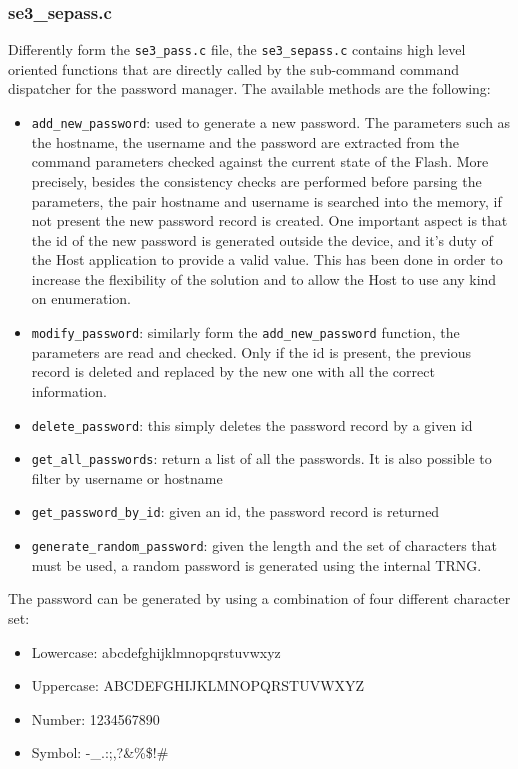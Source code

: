 \subsubsection{se3\_sepass.c}
Differently form the \texttt{se3\_pass.c} file, the \texttt{se3\_sepass.c} contains high level oriented functions that are directly called by the sub-command command dispatcher for the password manager.\newline\newline
The available methods are the following:
\begin{itemize}
	\item \texttt{add\_new\_password}: used to generate a new password. The parameters such as the hostname, the username and the password are extracted from the command parameters checked against the current state of the Flash. More precisely, besides the consistency checks are performed before parsing the parameters, the pair hostname and username is searched into the memory, if not present the new password record is created. One important aspect is that the id of the new password is generated outside the device, and it's duty of the Host application to provide a valid value. This has been done in order to increase the flexibility of the solution and to allow the Host to use any kind on enumeration.
	\item \texttt{modify\_password}: similarly form the \texttt{add\_new\_password} function, the parameters are read and checked. Only if the id is present, the previous record is deleted and replaced by the new one with all the correct information.
	\item \texttt{delete\_password}: this simply deletes the password record by a given id
	\item \texttt{get\_all\_passwords}: return a list of all the passwords. It is also possible to filter by username or hostname
	\item \texttt{get\_password\_by\_id}: given an id, the password record is returned
	\item \texttt{generate\_random\_password}: given the length and the set of characters that must be used, a random password is generated using the internal TRNG.
\end{itemize}

The password can be generated by using a combination of four different character set:
\begin{itemize}
	\item Lowercase: abcdefghijklmnopqrstuvwxyz
	\item Uppercase: ABCDEFGHIJKLMNOPQRSTUVWXYZ
	\item Number: 1234567890
	\item Symbol: -\_.:;,?\&\%\$!\@\#
\end{itemize}

